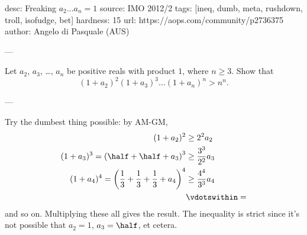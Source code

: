 desc:  Freaking $a_2 \dots a_n = 1$
source:  IMO 2012/2
tags:  [ineq, dumb, meta, rushdown, troll, isofudge, bet]
hardness: 15
url: https://aops.com/community/p2736375
author: Angelo di Pasquale (AUS)

---

Let $a_2$, $a_3$, \dots, $a_n$ be positive reals with product $1$,
where $n \ge 3$.
Show that
\[ (1+a_2)^2 (1+a_3)^3 \dots (1+a_n)^n > n^n. \]

---

Try the dumbest thing possible: by AM-GM,
\begin{align*}
  (1 + a_2)^2 &\ge 2^2 a_2 \\
  (1 + a_3)^3 = \left( \half + \half + a_3 \right)^3 &\ge \frac{3^3}{2^2} a_3 \\
  (1 + a_4)^4 = \left( \frac13 + \frac13 + \frac13 + a_4 \right)^4
    &\ge \frac{4^4}{3^3} a_4 \\
  &\vdotswithin=
\end{align*}
and so on.
Multiplying these all gives the result.
The inequality is strict since it's not possible
that $a_2 = 1$, $a_3 = \half$, et cetera.
